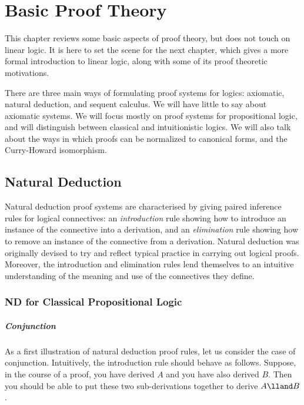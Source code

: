 \chapter{Basic Proof Theory}\label{CH1}\label{Ch1}

This chapter reviews some basic aspects of proof theory, but does not
touch on linear logic.  It is here to set the scene for the next
chapter, which gives a more formal introduction to linear logic, along
with some of its proof theoretic motivations.

There are three main ways of formulating proof systems for logics:
axiomatic, natural deduction, and sequent calculus.  We will have
little to say about axiomatic systems.  We will focus mostly on
proof systems for propositional logic, and will distinguish between
classical and intuitionistic logics.  We will also talk about the
ways in which proofs can be normalized to canonical forms, and the
Curry-Howard isomorphism.


\section{Natural Deduction}

Natural deduction proof systems are characterised by giving paired
inference rules for logical connectives: an {\it introduction} rule
showing how to introduce an instance of the connective into a
derivation, and an {\it elimination} rule showing how to remove an
instance of the connective from a derivation.  Natural deduction was 
originally devised to try and reflect typical practice in carrying
out logical proofs.  Moreover, the introduction and elimination rules
lend themselves to an intuitive understanding of the meaning and
use of the connectives they define.

\subsection{ND for Classical Propositional Logic}

\paragraph{Conjunction}

As a first illustration of natural deduction proof rules, let us
consider the case of conjunction.  Intuitively, the introduction rule
should behave as follows.  Suppose, in the course of a proof, you have
derived $A$ and you have also derived $B$. Then you should be able
to put these two sub-derivations together to derive $A\lland B$.

